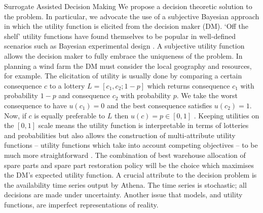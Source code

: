 \begin{chapter}{Surrogate Assisted Decision Making \label{Chap:optimisation}}
We propose a decision theoretic solution to the problem. In particular, we advocate the use of a subjective Bayesian approach in which the utility function is elicited from the decision maker (DM). `Off the shelf' utility functions have found themselves to be popular in well-defined scenarios such as Bayesian experimental design \citep{Ryan2016}. A subjective utility function allows the decision maker to fully embrace the uniqueness of the problem. In planning a wind farm the DM must consider the local geography and resources, for example.  The elicitation of utility is usually done by comparing a certain consequence $c$ to a lottery $ L =  [c_1, c_2 ; 1-p]$ which returns consequence $c_1$ with probability $1-p$ and consequence $c_2$ with probability $p$. We take the worst consequence to have $u(c_1) = 0$ and the best consequence satisfies $u(c_2) = 1$. Now, if $c$ is equally preferable to $L$ then $u(c) = p \in [0,1]$ \citep{Smith2010}. Keeping utilities on the $[0,1]$ scale means the utility function is interpretable in terms of lotteries and probabilities but also allows the construction of multi-attribute utility functions -- utility functions which take into account competing objectives -- to be much more straightforward \citep{Gonzalez2018, Morton2018}. The combination of best warehouse allocation of spare parts and spare part restoration policy will be the choice which maximises the DM's expected utility function. A crucial attribute to the decision problem is the availability time series output by Athena. The time series is stochastic; all decisions are made under uncertainty. Another issue that models, and utility functions, are imperfect representations of reality.




\end{chapter}
